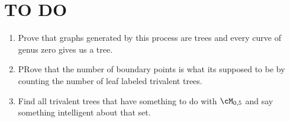 \documentclass[12pt]{memoir}
\begin{document}
\section*{TO DO}
\begin{enumerate}
    \item Prove that graphs generated by this process are trees and every curve of genus zero gives us a tree. 
    \item PRove that the number of boundary points is what its supposed to be by counting the number of leaf labeled trivalent trees. 
    \item Find all trivalent trees that have something to do with $\cM_{0,5}$ and say something intelligent about that set.
\end{enumerate}
\end{document}
